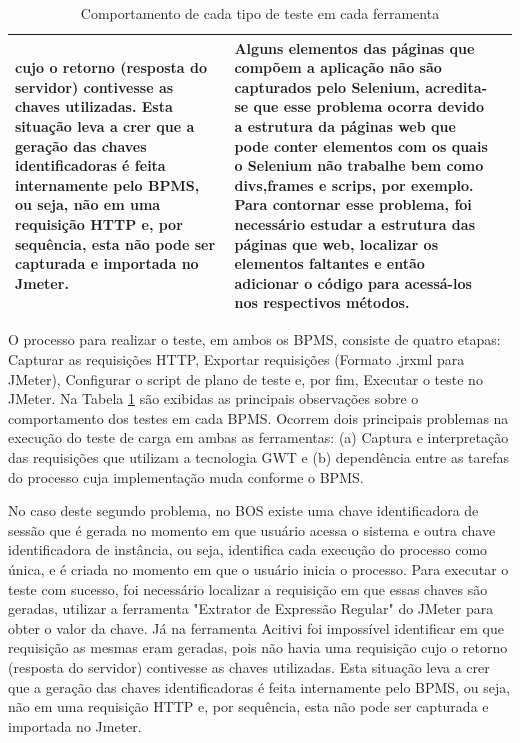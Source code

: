 \documentclass[12pt]{article}
\begin{document}
\begin{table}
{\begin{tabular}{|p{2cm}|p{7cm}|p{7cm}|}
cujo o retorno (resposta do servidor) contivesse as chaves utilizadas. Esta situação leva a crer
que a geração das chaves identificadoras é feita internamente pelo BPMS, ou seja, não em uma
requisição HTTP e, por sequência, esta não pode ser capturada e importada no Jmeter. & 
Alguns elementos das páginas que compõem a aplicação não são capturados pelo Selenium, acredita-se que esse problema ocorra devido a estrutura da páginas web que pode conter elementos com os quais o Selenium não trabalhe bem como divs,frames e
scrips, por exemplo. Para contornar esse problema, foi necessário estudar a estrutura das páginas que web, localizar os elementos faltantes e então adicionar o código para acessá-los nos respectivos métodos.\\\hline
\end{tabular}
}
\caption{Comportamento de cada tipo de teste em cada ferramenta}
\label{tab:bpms2}
\end{table}

O processo para realizar o teste, em ambos os BPMS, consiste de quatro etapas: Capturar as requisições HTTP, Exportar requisições (Formato .jrxml para JMeter), Configurar o script de plano de teste e, por fim, Executar o teste no JMeter. Na Tabela \ref{tab:bpms2} são exibidas as principais observações sobre o comportamento dos testes em cada BPMS. Ocorrem dois principais problemas na execução do teste de carga em ambas as ferramentas: (a) Captura e interpretação das requisições que utilizam a tecnologia GWT e (b) dependência entre as tarefas do processo cuja implementação muda conforme o BPMS. 

No caso deste segundo problema, no BOS existe uma chave identificadora de sessão que é gerada no momento em que usuário acessa o sistema e outra chave identificadora de instância, ou seja, identifica cada execução do processo como única, e é criada no momento em que o usuário inicia o processo. Para executar o teste com sucesso, foi necessário localizar a requisição em que essas chaves são geradas, utilizar a ferramenta "Extrator de Expressão Regular" do JMeter para obter o valor da chave. Já na ferramenta Acitivi foi impossível identificar em que requisição as mesmas eram geradas, pois não havia uma requisição cujo o retorno (resposta do servidor) contivesse as chaves utilizadas. Esta situação leva a crer que a geração das chaves identificadoras é feita internamente pelo BPMS, ou seja, não em uma requisição HTTP e, por sequência, esta não pode ser capturada e importada no Jmeter.

\end{document}
